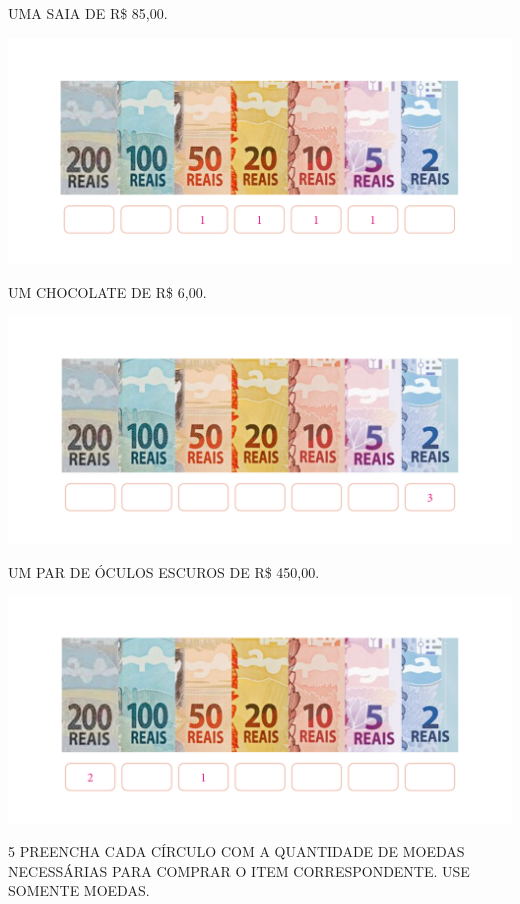 \begin{escolha}
\item UMA SAIA DE R\$ 85,00.

\includegraphics[width=.8\textwidth]{./media/SAEB_1ANO_MAT_FIGURA74.png}

\item UM CHOCOLATE DE R\$ 6,00.

\includegraphics[width=.8\textwidth]{./media/SAEB_1ANO_MAT_FIGURA75.png}

\item UM PAR DE ÓCULOS ESCUROS DE R\$ 450,00.

\includegraphics[width=.8\textwidth]{./media/SAEB_1ANO_MAT_FIGURA76.png}
\end{escolha}


\pagebreak
\num{5} PREENCHA CADA CÍRCULO COM A QUANTIDADE DE MOEDAS NECESSÁRIAS PARA COMPRAR O ITEM CORRESPONDENTE. USE SOMENTE MOEDAS.

